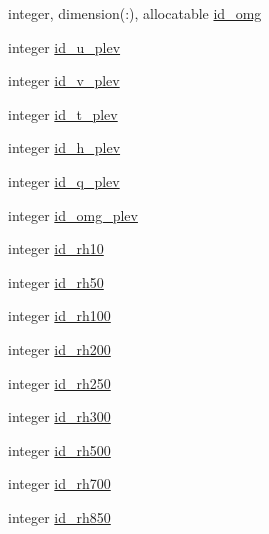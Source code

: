 \begin{DoxyCompactItemize}
\item 
integer, dimension(\-:), allocatable \hyperlink{structfv__arrays__mod_1_1fv__diag__type_a5cbfc6d945494714b611d2efe81cf95f}{id\-\_\-omg}
\item 
integer \hyperlink{structfv__arrays__mod_1_1fv__diag__type_af5107a36d7c957fa11fb59c235f39417}{id\-\_\-u\-\_\-plev}
\item 
integer \hyperlink{structfv__arrays__mod_1_1fv__diag__type_a3a481ce94324a088e5a6e832562bb226}{id\-\_\-v\-\_\-plev}
\item 
integer \hyperlink{structfv__arrays__mod_1_1fv__diag__type_a9240bb6e4d754543c4cd2b304e04a550}{id\-\_\-t\-\_\-plev}
\item 
integer \hyperlink{structfv__arrays__mod_1_1fv__diag__type_a0f76fef7927923ca7cd5a87b9fe741fa}{id\-\_\-h\-\_\-plev}
\item 
integer \hyperlink{structfv__arrays__mod_1_1fv__diag__type_ac8f310e21828d67bb18b441b2561cfb1}{id\-\_\-q\-\_\-plev}
\item 
integer \hyperlink{structfv__arrays__mod_1_1fv__diag__type_a5e9a9f0917c7dc78d3fb933acc1b2765}{id\-\_\-omg\-\_\-plev}
\item 
integer \hyperlink{structfv__arrays__mod_1_1fv__diag__type_a2c527a8bd28698419f9b6b4416fe75b3}{id\-\_\-rh10}
\item 
integer \hyperlink{structfv__arrays__mod_1_1fv__diag__type_a401e52db9f8c72a8650a9427aea46f0a}{id\-\_\-rh50}
\item 
integer \hyperlink{structfv__arrays__mod_1_1fv__diag__type_a9f86116f4ee412db01c782624f5cadc0}{id\-\_\-rh100}
\item 
integer \hyperlink{structfv__arrays__mod_1_1fv__diag__type_a9849054fc1a746d323ef658a3cad14fe}{id\-\_\-rh200}
\item 
integer \hyperlink{structfv__arrays__mod_1_1fv__diag__type_a45d53eadf7954529d66e5508e67d8579}{id\-\_\-rh250}
\item 
integer \hyperlink{structfv__arrays__mod_1_1fv__diag__type_a8803b09da1fc38c3cd4a3694ea78c771}{id\-\_\-rh300}
\item 
integer \hyperlink{structfv__arrays__mod_1_1fv__diag__type_a808319093e2a56a49d37b27ddf708713}{id\-\_\-rh500}
\item 
integer \hyperlink{structfv__arrays__mod_1_1fv__diag__type_a46cc6563313a95577855a167d8344b3d}{id\-\_\-rh700}
\item 
integer \hyperlink{structfv__arrays__mod_1_1fv__diag__type_ae54b86362492956ab121864e53e2b6cf}{id\-\_\-rh850}
\item 

\end{DoxyCompactItemize}
